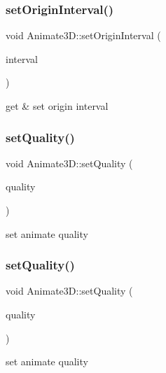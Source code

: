 \subsubsection{\texorpdfstring{set\+Origin\+Interval()}{setOriginInterval()}\hspace{0.1cm}{\footnotesize\ttfamily [2/2]}}
{\footnotesize\ttfamily void Animate3\+D\+::set\+Origin\+Interval (\begin{DoxyParamCaption}\item[{float}]{interval }\end{DoxyParamCaption})}

get \& set origin interval \mbox{\label{classAnimate3D_a0dd43ee90872c19d04c87904fceb99a6}} 
\subsubsection{\texorpdfstring{set\+Quality()}{setQuality()}\hspace{0.1cm}{\footnotesize\ttfamily [1/2]}}
{\footnotesize\ttfamily void Animate3\+D\+::set\+Quality (\begin{DoxyParamCaption}\item[{Animate3\+D\+Quality}]{quality }\end{DoxyParamCaption})}

set animate quality \mbox{\label{classAnimate3D_a0dd43ee90872c19d04c87904fceb99a6}} 
\subsubsection{\texorpdfstring{set\+Quality()}{setQuality()}\hspace{0.1cm}{\footnotesize\ttfamily [2/2]}}
{\footnotesize\ttfamily void Animate3\+D\+::set\+Quality (\begin{DoxyParamCaption}\item[{Animate3\+D\+Quality}]{quality }\end{DoxyParamCaption})}

set animate quality \mbox{\label{classAnimate3D_aba0ac7ebee334d4348a945c781a12a66}} 
